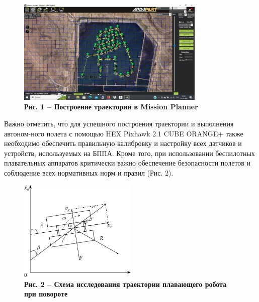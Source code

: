 \begin{figure}[H]
	\centering
	\includegraphics[width=0.8\textwidth]{assets/208}
	\caption*{\bfseries Рис. 1 -- Построение траектории в Mission Planner}
\end{figure}

\begin{multicols}{2}


Важно отметить, что для успешного построения траектории и выполнения
автоном-ного полета с помощью HEX Pixhawk 2.1 CUBE ORANGE+ также
необходимо обеспечить правильную калибровку и настройку всех датчиков и
устройств, используемых на БППА. Кроме того, при использовании
беспилотных плавательных аппаратов критически важно обеспечение
безопасности полетов и соблюдение всех нормативных норм и правил (Рис.
2).
\end{multicols}

\begin{figure}[H]
	\centering
	\includegraphics[width=0.5\textwidth]{assets/209}
	\caption*{\bfseries Рис. 2 -- Схема исследования траектории плавающего робота при
  повороте}
\end{figure}



